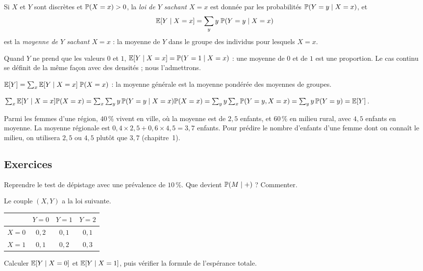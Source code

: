 \begin{definition}
Si $X$ et $Y$ sont discrètes et $\P(X=x)>0$, la \emph{loi de $Y$ sachant $X=x$} est donnée par les probabilités $\P(Y=y\mid X=x)$, et
\[
  \E[Y\mid X=x]=\sum_yy\;\P(Y=y\mid X=x)
\]
est la \emph{moyenne de $Y$ sachant $X=x$} : la moyenne de $Y$ dans le groupe des individus pour lesquels $X=x$.
\end{definition}

Quand $Y$ ne prend que les valeurs $0$ et $1$, $\E[Y\mid X=x]=\P(Y=1\mid X=x)$ : une moyenne de $0$ et de $1$ est une proportion.
Le cas continu se définit de la même façon avec des densités ; nous l'admettrons.

\begin{proposition}
\label{prop:tour}
$\E[Y]=\sum_x\E[Y\mid X=x]\;\P(X=x)$ : la moyenne générale est la moyenne pondérée des moyennes de groupes.
\end{proposition}
\begin{preuve}
$\sum_x\E[Y\mid X=x]\P(X=x)=\sum_x\sum_yy\,\P(Y=y\mid X=x)\P(X=x)=\sum_y y\sum_x\P(Y=y,X=x)=\sum_yy\,\P(Y=y)=\E[Y]$.
\end{preuve}

\begin{exemple}
Parmi les femmes d'une région, $40\,\%$ vivent en ville, où la moyenne est de $2{,}5$ enfants, et $60\,\%$ en milieu rural, avec $4{,}5$ enfants en moyenne.
La moyenne régionale est $0{,}4\times2{,}5+0{,}6\times4{,}5=3{,}7$ enfants.
Pour prédire le nombre d'enfants d'une femme dont on connaît le milieu, on utilisera $2{,}5$ ou $4{,}5$ plutôt que $3{,}7$ (chapitre~1).
\end{exemple}

\subsection*{Exercices}

\begin{exercice}
\label{ex:prevalence}
Reprendre le test de dépistage avec une prévalence de $10\,\%$. Que devient $\P(M\mid+)$ ? Commenter.
\end{exercice}

\begin{exercice}
\label{ex:tableau}
Le couple $(X,Y)$ a la loi suivante.
\begin{center}
\begin{tabular}{c|ccc}
 & $Y=0$ & $Y=1$ & $Y=2$ \\ \hline
$X=0$ & $0{,}2$ & $0{,}1$ & $0{,}1$ \\
$X=1$ & $0{,}1$ & $0{,}2$ & $0{,}3$
\end{tabular}
\end{center}
Calculer $\E[Y\mid X=0]$ et $\E[Y\mid X=1]$, puis vérifier la formule de l'espérance totale.
\end{exercice}
